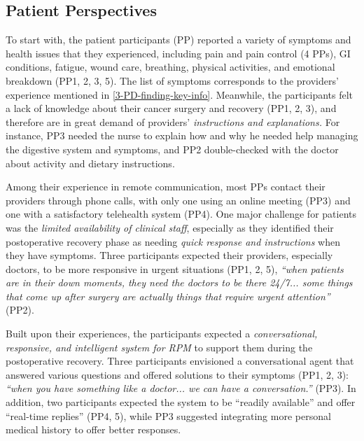 \subsection{Patient Perspectives}
\label{subsec:3-formative-patient-findings}

\label{para:3-formative-patient-needs}
To start with, the patient participants (PP) reported a variety of symptoms and health issues that they experienced, including pain and pain control (4 PPs), GI conditions, fatigue, wound care, breathing, physical activities, and emotional breakdown (PP1, 2, 3, 5). The list of symptoms corresponds to the providers' experience mentioned in \ref{3-PD-finding-key-info}.
Meanwhile, the participants felt a lack of knowledge about their cancer surgery and recovery (PP1, 2, 3), and therefore are in great demand of providers' \textit{ instructions and explanations.} 
For instance, PP3 needed the nurse to explain how and why he needed help managing the digestive system and symptoms, and PP2 double-checked with the doctor about activity and dietary instructions.


\label{para:3-formative-patient-availability}
Among their experience in remote communication, most PPs contact their providers through phone calls, with only one using an online meeting (PP3) and one with a satisfactory telehealth system (PP4).
One major challenge for patients was the \textit{limited availability of clinical staff}, especially as they identified their postoperative recovery phase as needing \textit{quick response and instructions} when they have symptoms. Three participants expected their providers, especially doctors, to be more responsive in urgent situations (PP1, 2, 5), \textit{``when patients are in their down moments, they need the doctors to be there 24/7... some things that come up after surgery are actually things that require urgent attention''} (PP2).


\label{para:3-formative-patient-CA}
Built upon their experiences, the participants expected a \textit{conversational, responsive, and intelligent system for RPM} to support them during the postoperative recovery. Three participants envisioned a conversational agent that answered various questions and offered solutions to their symptoms (PP1, 2, 3): \textit{``when you have something like a doctor... we can have a conversation.''} (PP3). In addition, two participants expected the system to be ``readily available'' and offer ``real-time replies'' (PP4, 5), while PP3 suggested integrating more personal medical history to offer better responses.

